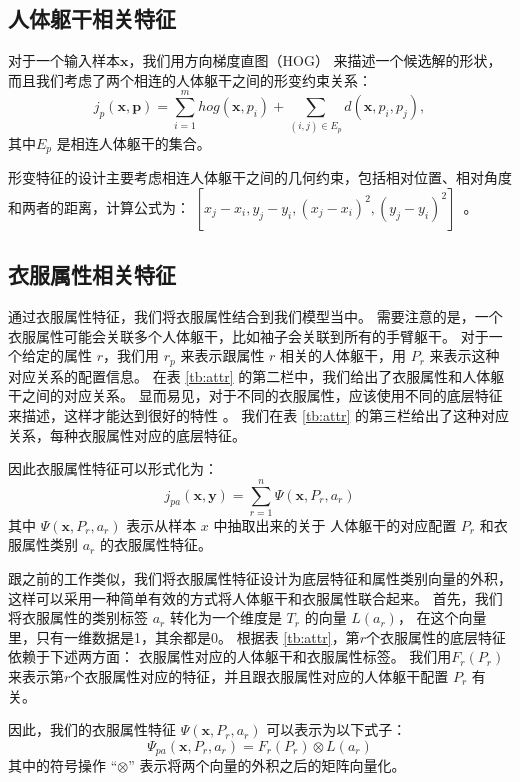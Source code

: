 \subsection{人体躯干相关特征}
对于一个输入样本$\mathbf{x}$，我们用方向梯度直图（HOG）\cite{hog} 来描述一个候选解的形状，
而且我们考虑了两个相连的人体躯干之间的形变约束关系：
\begin{equation}
    j_p(\mathbf{x}, \mathbf{p}) = \sum_{i=1}^m hog(\mathbf{x}, p_i) + \sum_{(i, j) \in E_p} d(\mathbf{x}, p_i, p_j),
\end{equation}
其中$E_p$ 是相连人体躯干的集合。

形变特征的设计主要考虑相连人体躯干之间的几何约束，包括相对位置、相对角度和两者的距离，计算公式为：
$[x_j - x_i, y_j - y_i, (x_j - x_i)^2, (y_j - y_i)^2]$~\cite{deva11}。

\subsection{衣服属性相关特征}
通过衣服属性特征，我们将衣服属性结合到我们模型当中。
需要注意的是，一个衣服属性可能会关联多个人体躯干，比如袖子会关联到所有的手臂躯干。
对于一个给定的属性 $r$，我们用 $r_p$ 来表示跟属性 $r$ 相关的人体躯干，用 $P_r$ 来表示这种对应关系的配置信息。
在表 \ref{tb:attr} 的第二栏中，我们给出了衣服属性和人体躯干之间的对应关系。
显而易见，对于不同的衣服属性，应该使用不同的底层特征来描述，这样才能达到很好的特性 \cite{clothliu}。
我们在表 \ref{tb:attr} 的第三栏给出了这种对应关系，每种衣服属性对应的底层特征。

因此衣服属性特征可以形式化为：
\begin{equation}
    \label{eq:j_pa}
    j_{pa}(\mathbf{x}, \mathbf{y}) = \sum_{r=1}^n \Psi(\mathbf{x}, P_r, a_r)
\end{equation}
其中 $\Psi(\mathbf{x}, P_r, a_r)$ 表示从样本 $x$ 中抽取出来的关于 人体躯干的对应配置 $P_r$ 和衣服属性类别 $a_r$ 的衣服属性特征。


跟之前的工作\cite{shen2014unified}类似，我们将衣服属性特征设计为底层特征和属性类别向量的外积，这样可以采用一种简单有效的方式将人体躯干和衣服属性联合起来。
首先，我们将衣服属性的类别标签 $a_r$ 转化为一个维度是 $T_r$ 的向量 $L(a_r)$，
在这个向量里，只有一维数据是1，其余都是0。
根据表 \ref{tb:attr}，第$r$个衣服属性的底层特征依赖于下述两方面：
衣服属性对应的人体躯干和衣服属性标签。
我们用$F_r(P_r)$来表示第$r$个衣服属性对应的特征，并且跟衣服属性对应的人体躯干配置 $P_r$ 有关。

因此，我们的衣服属性特征 $\Psi(\mathbf{x}, P_r, a_r)$ 可以表示为以下式子：
\begin{equation}
    \Psi_{pa}(\mathbf{x}, P_r, a_r) = F_r(P_r) \otimes L(a_r)
\end{equation}
其中的符号操作 ``$\otimes$'' 表示将两个向量的外积之后的矩阵向量化。

